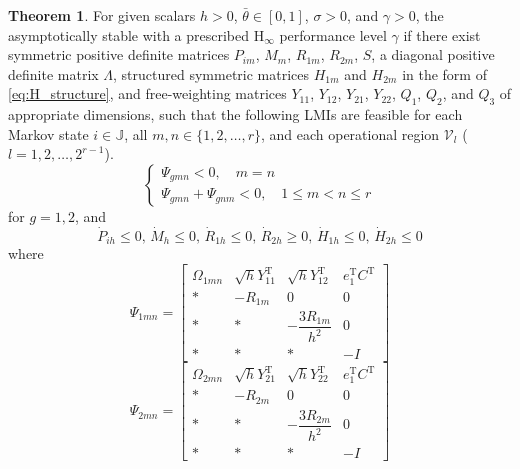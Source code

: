 \documentclass[preprint,review,fleqn,sort&compress,3p]{elsarticle}
\theoremstyle{definition} %
\theoremstyle{definition}%
\newtheorem{thm}{Theorem}[section]
\newif\ifreviewmarkup
\DeclareRobustCommand{\revdel}[1]{\ifreviewmarkup{\color{revisionred}\hypersetup{linkcolor=revisionred,citecolor=revisionred}#1}\fi}
\DeclareRobustCommand{\revadd}[1]{{\ifreviewmarkup\color{revisiongreen}\hypersetup{linkcolor=revisiongreen,citecolor=revisiongreen}\fi#1}}
\begin{document}
\begin{thm}\label{thm1}
\label{rev:M29}For given scalars $h>0$, $\bar{\theta}\in[0,1]$, $\sigma>0$, and $\gamma>0$, the \revdel{closed-loop IT-2 fuzzy CPSs \eqref{eq:closed_loop} is} asymptotically stable with a prescribed $\mathrm{H}_\infty$ performance level $\gamma$ if there exist symmetric positive definite matrices
$P_{im}$, $M_m$, $R_{1m}$, $R_{2m}$, $S$, a diagonal positive definite matrix $\Lambda$,
structured symmetric matrices $H_{1m}$ and $H_{2m}$ in the form of \eqref{eq:H_structure},
and free-weighting matrices
$Y_{11}$, $Y_{12}$, $Y_{21}$, $Y_{22}$, $Q_1$, $Q_2$, and $Q_3$
of appropriate dimensions, such that the following LMIs are feasible for each Markov state $i\in\mathbb{J}$, all $m,n\in\{1,2,\ldots,r\}$, and each operational region $\mathcal V_l$ ($l=1,2,\ldots,2^{r-1}$).
\begin{equation}\label{shucr1}
	\begin{cases}
		\Psi_{gmn} < 0 ,\quad  m=n  \\
		\Psi_{gmn} + \Psi_{gnm} < 0,\quad 1 \le m < n \le r
	\end{cases}
\end{equation}
for $g=1,2$, and
\begin{equation}\label{dot_small_0}
	\dot{P}_{ih} \leq 0, \, 
	\dot{M}_{h} \leq 0, \, 
	\dot{R}_{1h} \leq 0, \, 
	\dot{R}_{2h} \geq 0, \, 
	\dot{H}_{1h} \leq 0, \, 
	\dot{H}_{2h} \leq 0
\end{equation}
where
\begin{equation}\label{LMI1}
	\Psi_{1mn} =
	\begin{bmatrix}
		\Omega_{1mn} & \sqrt{h}Y_{11}^{\mathrm{T}} & \sqrt{h}Y_{12}^{\mathrm{T}} & e_1^{\mathrm{T}} C^{\mathrm{T}} \\[1.5ex]
		* & -R_{1m} & 0 & 0  \\[1.5ex]
		* & * & -\dfrac{3R_{1m}}{h^2} & 0 \\[1.5ex]
		* & * & * & -I
	\end{bmatrix}
\end{equation}
\begin{equation}\label{LMI2}
	\Psi_{2mn} =
	\begin{bmatrix}
		\Omega_{2mn} & \sqrt{h}Y_{21}^{\mathrm{T}} & \sqrt{h}Y_{22}^{\mathrm{T}} & e_1^{\mathrm{T}} C^{\mathrm{T}} \\[1.5ex]
		* & -R_{2m} & 0 & 0 \\[1.5ex]
		* & * & -\dfrac{3R_{2m}}{h^2} & 0  \\[1.5ex]
		* & * & * & -I 


\end{bmatrix}
\end{equation}
\end{thm}
\end{document}
